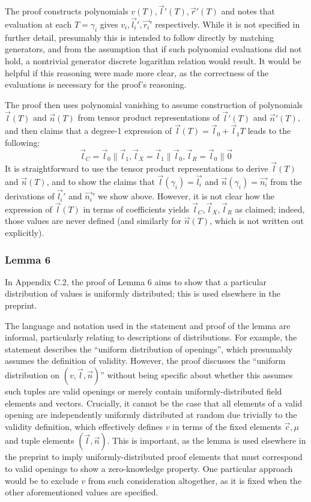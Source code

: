\documentclass{article}
\begin{document}
The proof constructs polynomials $v(T), \vec{l}'(T), \vec{r}'(T)$ and notes that evaluation at each $T = \gamma_i$ gives $v_i, \vec{l_i}', \vec{r_i}'$ respectively.
While it is not specified in further detail, presumably this is intended to follow directly by matching generators, and from the assumption that if such polynomial evaluations did not hold, a nontrivial generator discrete logarithm relation would result.
It would be helpful if this reasoning were made more clear, as the correctness of the evaluations is necessary for the proof's reasoning.

The proof then uses polynomial vanishing to assume construction of polynomials $\vec{l}(T)$ and $\vec{n}(T)$ from tensor product representations of $\vec{l}'(T)$ and $\vec{n}'(T)$, and then claims that a degree-1 expression of $\vec{l}(T) = \vec{l}_0 + \vec{l}_1T$ leads to the following:
$$\vec{l}_C = \vec{l}_0 \| \vec{l}_1, \vec{l}_X = \vec{l}_1 \| \vec{l}_0, \vec{l}_R = \vec{l}_0 \| \vec{0}$$
It is straightforward to use the tensor product representations to derive $\vec{l}(T)$ and $\vec{n}(T)$, and to show the claims that $\vec{l}(\gamma_i) = \vec{l_i}$ and $\vec{n}(\gamma_i) = \vec{n_i}$ from the derivations of $\vec{l_i}'$ and $\vec{n_i}'$ we show above.
However, it is not clear how the expression of $\vec{l}(T)$ in terms of coefficients yields $\vec{l}_C, \vec{l}_X, \vec{l}_R$ as claimed; indeed, those values are never defined (and similarly for $\vec{n}(T)$, which is not written out explicitly).


\subsubsection{Lemma 6}

In Appendix C.2, the proof of Lemma 6 aims to show that a particular distribution of values is uniformly distributed; this is used elsewhere in the preprint.

The language and notation used in the statement and proof of the lemma are informal, particularly relating to descriptions of distributions.
For example, the statement describes the ``uniform distribution of openings'', which presumably assumes the definition of validity.
However, the proof discusses the ``uniform distribution on $(v, \vec{l}, \vec{n})$'' without being specific about whether this assumes such tuples are valid openings or merely contain uniformly-distributed field elements and vectors.
Crucially, it cannot be the case that all elements of a valid opening are independently uniformly distributed at random due trivially to the validity definition, which effectively defines $v$ in terms of the fixed elements $\vec{c}, \mu$ and tuple elements $(\vec{l}, \vec{n})$.
This is important, as the lemma is used elsewhere in the preprint to imply uniformly-distributed proof elements that must correspond to valid openings to show a zero-knowledge property.
One particular approach would be to exclude $v$ from such consideration altogether, as it is fixed when the other aforementioned values are specified.
\end{document}
